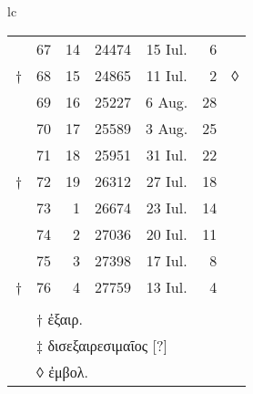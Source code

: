 \begin{tabular}{lc}
\begin{tabular}[t]{r rrccr l}
~ & 67 & 14 & 24474 & 15 Iul. &  6 \\
† & 68 & 15 & 24865 & 11 Iul. &  2 & ◊ \\
\cline{2-6}
~ & 69 & 16 & 25227 &  6 Aug. & 28 \\
~ & 70 & 17 & 25589 &  3 Aug. & 25 \\
~ & 71 & 18 & 25951 & 31 Iul. & 22 \\
† & 72 & 19 & 26312 & 27 Iul. & 18 \\
\cline{2-6}
~ & 73 &  1 & 26674 & 23 Iul. & 14 \\
~ & 74 &  2 & 27036 & 20 Iul. & 11 \\
~ & 75 &  3 & 27398 & 17 Iul. &  8 \\
† & 76 &  4 & 27759 & 13 Iul. &  4 \\
\cline{2-6}
\\
~ & \multicolumn{5}{l}{† \textgreek{ἐξαιρ.}}\\
~ & \multicolumn{5}{l}{‡ \textgreek{δισεξαιρεσιμαῖος [?]}}\\
~ & \multicolumn{5}{l}{◊ \textgreek{ἐμβολ.}}\\
\end{tabular}
\end{tabular}
%
